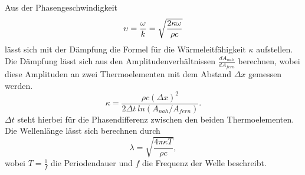 Aus der Phasengeschwindigkeit
\begin{equation}
    \upsilon = \frac{\omega}{k} = \sqrt{\frac{2\kappa \omega}{\rho c}}
    \label{eqn:upsilon}\\
\end{equation} 
lässt sich mit der Dämpfung die Formel für die Wärmeleitfähigkeit $\kappa$ aufstellen. 
Die Dämpfung lässt sich aus den Amplitudenverhältnissen $\frac{dA_{nah}}{dA_{fern}}$ berechnen, wobei diese Amplituden an zwei Thermoelementen mit dem Abstand $\Delta x$ gemessen werden.
\begin{equation}
    \kappa =\frac{\rho c (\Delta x)^2}{2\Delta t \: ln(A_{nah}/A_{fern})}\label{eqn:kappa}.
\end{equation}
$\Delta t$ steht hierbei für die Phasendifferenz zwischen den beiden Thermoelementen.
Die Wellenlänge lässt sich berechnen durch 
\begin{equation}
  \label{eqn:welle}
  \lambda = \sqrt{\frac{4 \pi \kappa T}{\rho c}},
\end{equation}
wobei $T=\frac{1}{f}$ die Periodendauer und $f$ die Frequenz der Welle beschreibt.
